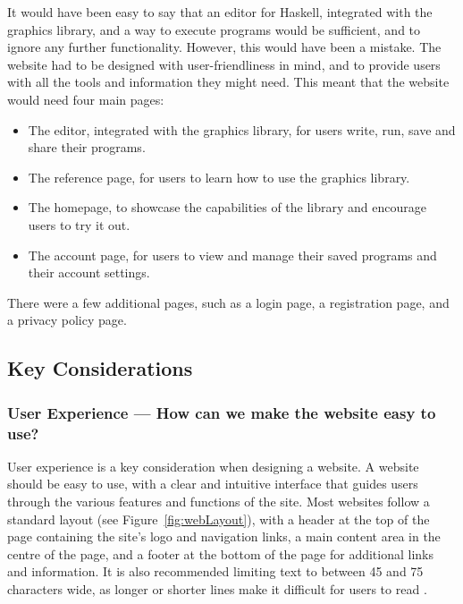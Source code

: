 \documentclass[../main.tex]{subfiles}
\begin{document}
            It would have been easy to say that an editor for Haskell, integrated with the
                graphics library, and a way to execute programs would be sufficient, and to
                ignore any further functionality.
            However, this would have been a mistake.
            The website had to be designed with user-friendliness in mind, and to provide
                users with all the tools and information they might need.
            This meant that the website would need four main pages:
            \begin{itemize}
                \item The editor, integrated with the graphics library, for users write, run, save
                      and share their programs.
                \item The reference page, for users to learn how to use the graphics library.
                \item The homepage, to showcase the capabilities of the library and encourage
                      users to try it out.
                \item The account page, for users to view and manage their saved programs and their
                      account settings.
            \end{itemize}
            There were a few additional pages, such as a login page, a registration page,
                and a privacy policy page.

        \subsection{Key Considerations}
            \subsubsection{User Experience — How can we make the website easy to use?}
                User experience is a key consideration when designing a website.
                A website should be easy to use, with a clear and intuitive interface that
                    guides users through the various features and functions of the site.
                Most websites follow a standard layout (see Figure~\ref{fig:webLayout}), with a
                    header at the top of the page containing the site's logo and navigation links,
                    a main content area in the centre of the page, and a footer at the bottom of
                    the page for additional links and information.
                It is also recommended limiting text to between 45 and 75 characters wide, as
                    longer or shorter lines make it difficult for users to read \citep{lineLength}.
\end{document}
